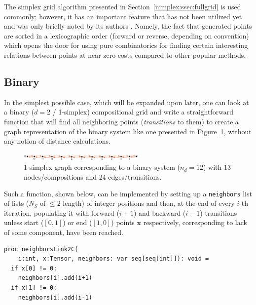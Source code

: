 The simplex grid algorithm presented in Section~\ref{nimplex:ssec:fullgrid} is used commonly; however, it has an important feature that has not been utilized yet and was only briefly noted by its authors \cite{Chasalow1995AlgorithmPoints}. Namely, the fact that generated points are sorted in a lexicographic order (forward or reverse, depending on convention) which opens the door for using pure combinatorics for finding certain interesting relations between points at near-zero costs compared to other popular methods.

\subsection{Binary} \label{nimplex:ssec:binarygraph}

In the simplest possible case, which will be expanded upon later, one can look at a binary ($d=2$ / 1-simplex) compositional grid and write a straightforward function that will find all neighboring points (\emph{transitions} to them) to create a graph representation of the binary system like one presented in Figure~\ref{nimplex:fig:binarysimplexgraph}, without any notion of distance calculations.

\begin{figure}[H]
    \centering
    \includegraphics[width=0.55\textwidth]{nimplex/SimplexGraphBinary.png}
    \caption{1-simplex graph corresponding to a binary system ($n_d=12$) with 13 nodes/compositions and 24 edges/transitions.} 
    \label{nimplex:fig:binarysimplexgraph}
\end{figure}

Such a function, shown below, can be implemented by setting up a \texttt{neighbors} list of lists ($N_S$ of $\leq2$ length) of integer positions and then, at the end of every $i$-th iteration, populating it with forward ($i+1$) and backward ($i-1$) transitions unless start ($[0,1]$) or end ($[1,0]$) points $\textbf{x}$ respectively, corresponding to lack of some component, have been reached.


\begin{verbatim}
proc neighborsLink2C(
    i:int, x:Tensor, neighbors: var seq[seq[int]]): void =
  if x[0] != 0:
    neighbors[i].add(i+1)
  if x[1] != 0:
    neighbors[i].add(i-1)
\end{verbatim}

